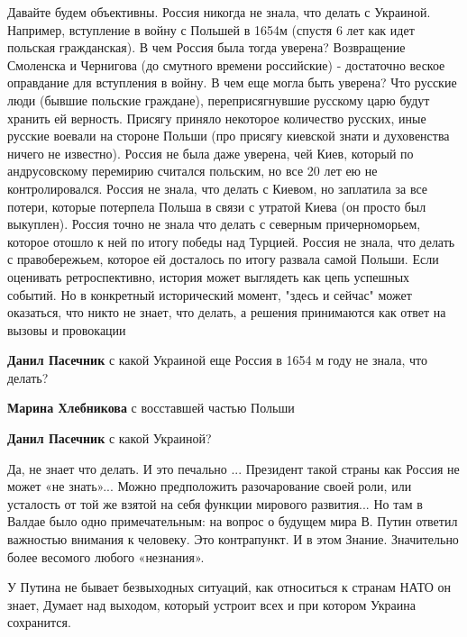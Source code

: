 \begin{itemize}
Давайте будем объективны. Россия никогда не знала, что делать с Украиной.
Например, вступление в войну с Польшей в 1654м (спустя 6 лет как идет польская
гражданская). В чем Россия была тогда уверена? Возвращение Смоленска и
Чернигова (до смутного времени российские) - достаточно веское оправдание для
вступления в войну. В чем еще могла быть уверена? Что русские люди (бывшие
польские граждане), переприсягнувшие русскому царю будут хранить ей верность.
Присягу приняло некоторое количество русских, иные русские воевали на стороне
Польши (про присягу киевской знати и духовенства ничего не известно). Россия не
была даже уверена, чей Киев, который по андрусовскому перемирию считался
польским, но все 20 лет ею не контролировался. Россия не знала, что делать с
Киевом, но заплатила за все потери, которые потерпела Польша в связи с утратой
Киева (он просто был выкуплен). Россия точно не знала что делать с северным
причерноморьем, которое отошло к ней по итогу победы над Турцией. Россия не
знала, что делать с правобережьем, которое ей досталось по итогу развала самой
Польши. Если оценивать ретроспективно, история может выглядеть как цепь
успешных событий. Но в конкретный исторический момент, "здесь и сейчас" может
оказаться, что никто не знает, что делать, а решения принимаются как ответ на
вызовы и провокации

\begin{itemize} %
\textbf{Данил Пасечник} с какой Украиной еще Россия в 1654 м году не знала, что делать?

\textbf{Марина Хлебникова} с восставшей частью Польши

\textbf{Данил Пасечник} с какой Украиной?
\end{itemize} %


Да, не знает что делать. И это печально ... Президент такой страны как Россия не
может «не знать»... Можно предположить разочарование своей роли, или усталость от
той же взятой на себя функции мирового развития... Но там в Валдае было одно
примечательным: на вопрос о будущем мира В. Путин ответил важностью внимания к
человеку. Это контрапункт. И в этом Знание. Значительно более весомого любого
«незнания».


У Путина не бывает безвыходных ситуаций, как относиться к странам НАТО он
знает, Думает над выходом, который устроит всех и при котором Украина
сохранится.


\end{itemize}
